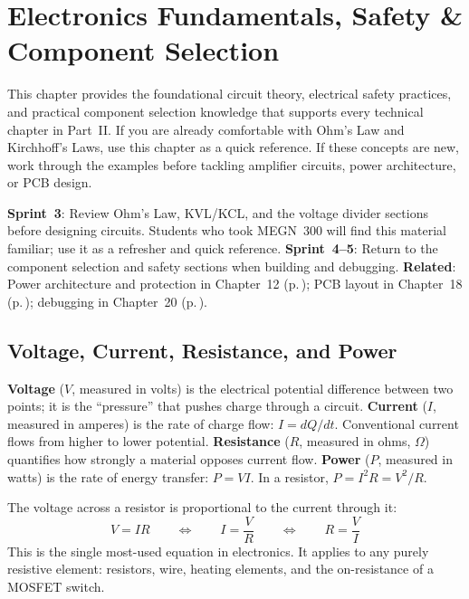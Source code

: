 \chapter{Electronics Fundamentals, Safety \& Component Selection}\label{ch:electronics}

\vspace{1em}

This chapter provides the foundational circuit theory, electrical safety practices, and practical component selection knowledge that supports every technical chapter in Part~II. If you are already comfortable with Ohm's Law and Kirchhoff's Laws, use this chapter as a quick reference. If these concepts are new, work through the examples before tackling amplifier circuits, power architecture, or PCB design.

\begin{tipbox}
\textbf{Sprint~3}: Review Ohm's Law, KVL/KCL, and the voltage divider sections before designing circuits. Students who took MEGN~300 will find this material familiar; use it as a refresher and quick reference. \textbf{Sprint~4--5}: Return to the component selection and safety sections when building and debugging. \textbf{Related}: Power architecture and protection in Chapter~12 (p.\,\pageref{ch:power}); PCB layout in Chapter~18 (p.\,\pageref{ch:pcb}); debugging in Chapter~20 (p.\,\pageref{ch:debug}).
\end{tipbox}

\vspace{1em}

\section{Voltage, Current, Resistance, and Power}

\textbf{Voltage} ($V$, measured in volts) is the electrical potential difference between two points; it is the ``pressure'' that pushes charge through a circuit. \textbf{Current} ($I$, measured in amperes) is the rate of charge flow: $I = dQ/dt$. Conventional current flows from higher to lower potential. \textbf{Resistance} ($R$, measured in ohms, $\Omega$) quantifies how strongly a material opposes current flow. \textbf{Power} ($P$, measured in watts) is the rate of energy transfer: $P = VI$. In a resistor, $P = I^2 R = V^2/R$.

\begin{keyconceptbox}
The voltage across a resistor is proportional to the current through it:
\begin{equation}
V = IR \qquad \Leftrightarrow \qquad I = \frac{V}{R} \qquad \Leftrightarrow \qquad R = \frac{V}{I}
\end{equation}
This is the single most-used equation in electronics. It applies to any purely resistive element: resistors, wire, heating elements, and the on-resistance of a MOSFET switch.
\end{keyconceptbox}


